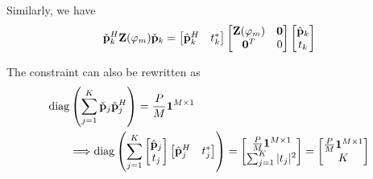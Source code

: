 Similarly, we have
\begin{equation}
    \check{\bf p}_k^H {\bf Z}(\varphi_m) \check{\bf p}_k = \begin{bmatrix} \hat{\bf p}_k^H & t_k^* \end{bmatrix} \begin{bmatrix} {\bf Z}(\varphi_m) & {\bf 0} \\ {\bf 0}^T & 0 \end{bmatrix} \begin{bmatrix} \hat{\bf p}_k \\ t_k \end{bmatrix}
\end{equation}

The constraint can also be rewritten as
\begin{align}
    \mathrm{diag}&\left( \sum_{j=1}^K \check{\bf p}_j \check{\bf p}_j^H \right) = \frac{P}{M}{\bf 1}^{M \times 1} \nonumber\\
    &\Longrightarrow\mathrm{diag} \left( \sum_{j=1}^K \begin{bmatrix} \hat{\bf p}_j \\ t_j\end{bmatrix} \begin{bmatrix} \hat{\bf p}_j^H & t_j^* \end{bmatrix}\right)  = \begin{bmatrix} \frac{P}{M} {\bf 1}^{M \times 1} \\ \sum_{j=1}^K |t_j|^2\end{bmatrix} = \begin{bmatrix} \frac{P}{M} {\bf 1}^{M \times 1} \\ K\end{bmatrix}
\end{align}

